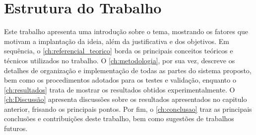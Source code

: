\section{Estrutura do Trabalho}

Este trabalho apresenta uma introdução sobre o tema, mostrando os fatores que motivam a implantação da ideia, além da justificativa e dos objetivos. Em sequência, o \autoref{ch:referencial_teorico} borda os principais conceitos teóricos e técnicos utilizados no trabalho. O \autoref{ch:metodologia}, por sua vez, descreve os detalhes de organização e implementação de todas as partes do sistema proposto, bem como os procedimentos adotados para os testes e validação, enquanto o \autoref{ch:resultados} trata de mostrar os resultados obtidos experimentalmente. O \autoref{ch:Discussão} apresenta discussões sobre os resultados apresentados no capitulo anterior, frisando os principais pontos. Por fim, o \autoref{ch:conclusao} traz as principais conclusões e contribuições deste trabalho, bem como sugestões de trabalhos futuros.


